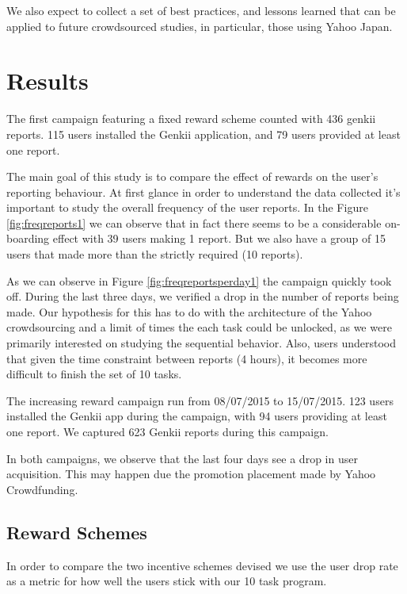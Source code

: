 \documentclass[letterpaper]{article}
\begin{document}
We also expect to collect a set of best practices, and lessons learned that can be applied to future crowdsourced studies, in particular, those using Yahoo Japan.  

\section{Results}

The first campaign featuring a fixed reward scheme counted with 436 genkii reports.
115 users installed the Genkii application, and 79 users provided at least one report.

The main goal of this study is to compare the effect of rewards on the user's reporting behaviour.
At first glance in order to understand the data collected it's important to study the overall frequency of the user reports. In the Figure \ref{fig:freqreports1} we can observe that in fact there seems to be a considerable on-boarding effect with 39 users making 1 report. But we also have a group of 15 users that made more than the strictly required (10 reports).



As we can observe in Figure \ref{fig:freqreportsperday1} the campaign quickly took off. During the last three days, we verified a drop in the number of reports being made. Our hypothesis for this has to do with the architecture of the Yahoo crowdsourcing and a limit of times the each task could be unlocked, as we were primarily interested on studying the sequential behavior. Also, users understood that given the time constraint between reports (4 hours), it becomes more difficult to finish the set of 10 tasks.


The increasing reward campaign run from 08/07/2015 to 15/07/2015.
123 users installed the Genkii app during the campaign, with 94 users providing at least one report. We captured 623 Genkii reports during this campaign.

In both campaigns, we observe that the last four days see a drop in user acquisition. This may happen due the promotion placement made by Yahoo Crowdfunding. 



\subsection{Reward Schemes}

In order to compare the two incentive schemes devised we use the user drop rate as a metric for how well the users stick with our 10 task program.
\end{document}
